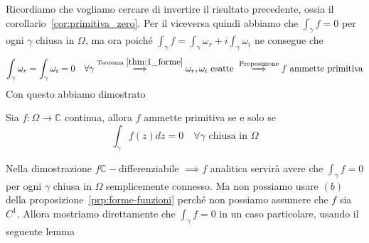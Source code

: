 Ricordiamo che vogliamo cercare di invertire il risultato precedente, ossia il
corollario~\ref{cor:primitiva_zero}. Per il viceversa quindi abbiamo che
\(\int_{\gamma} f = 0\) per ogni \(\gamma\) chiusa in \(\Omega\), ma ora poiché
\(\int_{\gamma} f = \int_{\gamma} \omega_{r} + i \int_{\gamma} \omega_{i} \) ne
consegue che 
\[
    \int_{\gamma} \omega_{r} = \int_{\gamma} \omega_{i} = 0 \quad \forall \gamma
    \overset{\text{Teorema }\ref{thm:1_forme}}{\implies } \omega_{r}, \omega_{i}
    \text{ esatte } \overset{\text{Proposizione}}{\implies } f \text{ ammette
    primitiva}
\]
Con questo abbiamo dimostrato
\begin{proposition}
    Sia \(f : \Omega \to \mathbb{C}\) continua, allora \(f\) ammette primitiva
    se e solo se 
    \[
        \int_{\gamma} f(z) dz = 0 \quad \forall \gamma \text{ chiusa in } \Omega
    \]
\end{proposition}
Nella dimostrazione \(f \mathbb{C}-\)differenziabile \(\implies f\) analitica
servirà avere che \(\int_{\gamma} f = 0\) per ogni \(\gamma\) chiusa in
\(\Omega\) semplicemente connesso. Ma non possiamo usare \((b)\) della
proposizione~\ref{prp:forme-funzioni} perché non possiamo assumere che \(f\) sia
\(C^{1}\). Allora mostriamo direttamente che \(\int_{\gamma} f = 0\) in un caso
particolare, usando il seguente lemma

